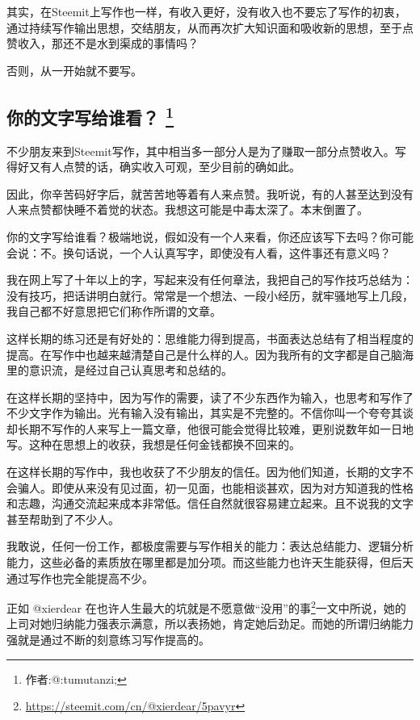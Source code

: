 \documentclass[]{ctexbook}
\renewcommand{\href}[2]{#2\footnote{\url{#1}}}
\begin{document}
其实，在Steemit上写作也一样，有收入更好，没有收入也不要忘了写作的初衷，通过持续写作输出思想，交结朋友，从而再次扩大知识面和吸收新的思想，至于点赞收入，那还不是水到渠成的事情吗？

否则，从一开始就不要写。

\subsection[你的文字写给谁看？ ]{\texorpdfstring{你的文字写给谁看？ \footnote{作者:@:tumutanzi;}}{你的文字写给谁看？ }}

不少朋友来到Steemit写作，其中相当多一部分人是为了赚取一部分点赞收入。写得好又有人点赞的话，确实收入可观，至少目前的确如此。

因此，你辛苦码好字后，就苦苦地等着有人来点赞。我听说，有的人甚至达到没有人来点赞都快睡不着觉的状态。我想这可能是中毒太深了。本末倒置了。

你的文字写给谁看？极端地说，假如没有一个人来看，你还应该写下去吗？你可能会说：不。换句话说，一个人认真写字，即使没有人看，这件事还有意义吗？

我在网上写了十年以上的字，写起来没有任何章法，我把自己的写作技巧总结为：没有技巧，把话讲明白就行。常常是一个想法、一段小经历，就牢骚地写上几段，我自己都不好意思把它们称作所谓的文章。

这样长期的练习还是有好处的：思维能力得到提高，书面表达总结有了相当程度的提高。在写作中也越来越清楚自己是什么样的人。因为我所有的文字都是自己脑海里的意识流，是经过自己认真思考和总结的。

在这样长期的坚持中，因为写作的需要，读了不少东西作为输入，也思考和写作了不少文字作为输出。光有输入没有输出，其实是不完整的。不信你叫一个夸夸其谈却长期不写作的人来写上一篇文章，他很可能会觉得比较难，更别说数年如一日地写。这种在思想上的收获，我想是任何金钱都换不回来的。

在这样长期的写作中，我也收获了不少朋友的信任。因为他们知道，长期的文字不会骗人。即使从来没有见过面，初一见面，也能相谈甚欢，因为对方知道我的性格和志趣，沟通交流起来成本非常低。信任自然就很容易建立起来。且不说我的文字甚至帮助到了不少人。

我敢说，任何一份工作，都极度需要与写作相关的能力：表达总结能力、逻辑分析能力，这些必备的素质放在哪里都是加分项。而这些能力也许天生能获得，但后天通过写作也完全能提高不少。

正如 @xierdear \href{https://steemit.com/cn/@xierdear/5pavyr}{在也许人生最大的坑就是不愿意做``没用''的事}一文中所说，她的上司对她归纳能力强表示满意，所以表扬她，肯定她后劲足。而她的所谓归纳能力强就是通过不断的刻意练习写作提高的。
\end{document}
